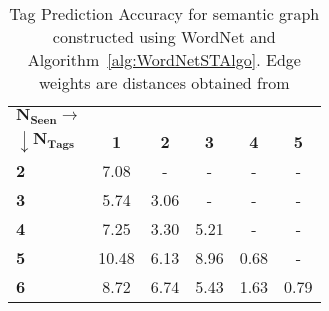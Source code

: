 
\begin{table}
\begin{center}
\caption{Tag Prediction Accuracy for semantic graph constructed using WordNet and Algorithm~\ref{alg:WordNetSTAlgo}. Edge weights are distances obtained from \cite{RitaLibraryWordNet}}
\label{tab:TPFlickr117WordnetSTWeightRita}
\begin{tabular}{|p{2cm}|c|c|c|c|c|}
		\hline
		{$\boldsymbol{N_{Seen} \rightarrow}$} & &  &  &  &\\ 
		{$\boldsymbol{\downarrow N_{Tags}}$} & \textbf{1} & \textbf{2} & \textbf{3} & \textbf{4} & \textbf{5}   \\ 	
		\hline
		\textbf{2} & 7.08 & - & - & - & -\\ 
		\hline
		\textbf{3} & 5.74 & 3.06 & - & - & -\\ 
		\hline
		\textbf{4} & 7.25 & 3.30 & 5.21 & - & -\\ 
		\hline
		\textbf{5} & 10.48 & 6.13 & 8.96 & 0.68 & -\\ 
		\hline
		\textbf{6} & 8.72 & 6.74 & 5.43 & 1.63 & 0.79 \\ 
		\hline
\end{tabular}
\end{center}
\end{table}





